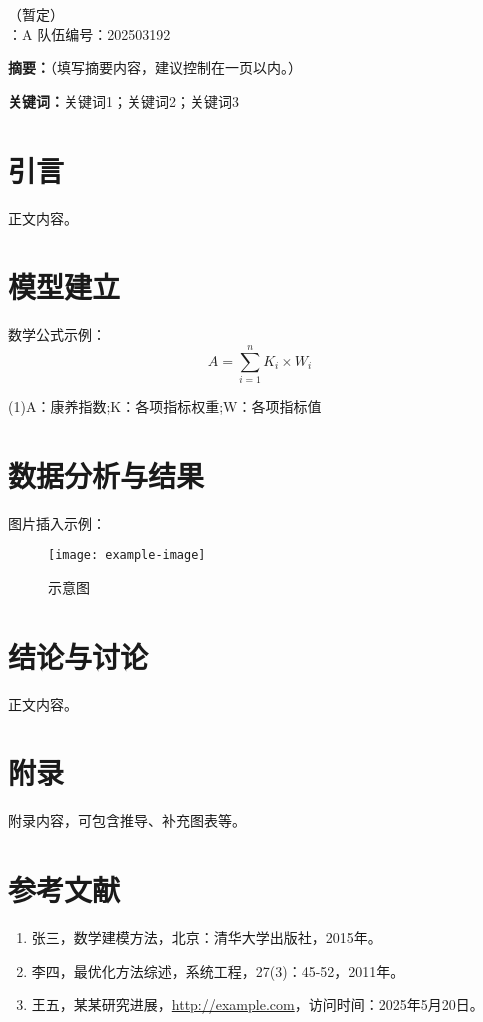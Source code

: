 \documentclass[12pt,a4paper]{article}
\begin{document}
\thispagestyle{empty}
\begin{center}
    （暂定） \\
    \vspace{1em}
    ：A \quad 队伍编号：202503192 \\
\end{center}

\vspace{2em}

\noindent\textbf{摘要：}（填写摘要内容，建议控制在一页以内。）

\vspace{1em}

\noindent\textbf{关键词：}关键词1；关键词2；关键词3

\newpage

\section{引言}
正文内容。

\section{模型建立}
数学公式示例：
\[
A = \sum_{i=1}^{n} K_i\times W_i
\]

(1)A：康养指数;K：各项指标权重;W：各项指标值

\section{数据分析与结果}
图片插入示例：
\begin{figure}[h]
    \centering
    \texttt{[image: example-image]} %
    \caption{示意图}
\end{figure}

\section{结论与讨论}
正文内容。

\newpage
\section*{附录}
附录内容，可包含推导、补充图表等。

\newpage
\section*{参考文献}
\begin{enumerate}
    \item 张三，数学建模方法，北京：清华大学出版社，2015年。
    \item 李四，最优化方法综述，系统工程，27(3)：45-52，2011年。%
    \item 王五，某某研究进展，\url{http://example.com}，访问时间：2025年5月20日。
\end{enumerate}
\end{document}
